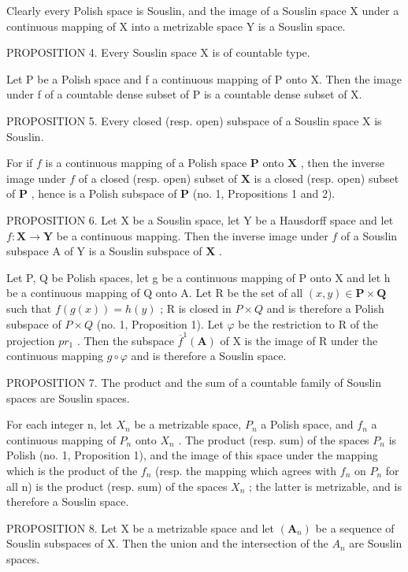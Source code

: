 Clearly every Polish space is Souslin, and the image of a Souslin space X under a continuous mapping of X into a metrizable space Y is a Souslin space.

PROPOSITION 4. Every Souslin space X is of countable type.

Let P be a Polish space and f a continuous mapping of P onto X. Then the image under f of a countable dense subset of P is a countable dense subset of X.

PROPOSITION 5. Every closed (resp. open) subspace of a Souslin space X is Souslin.

For if \(f\) is a continuous mapping of a Polish space \(\mathbf{P}\) onto \(\mathbf{X}\) , then the inverse image under \(f\) of a closed (resp. open) subset of \(\mathbf{X}\) is a closed (resp. open) subset of \(\mathbf{P}\) , hence is a Polish subspace of \(\mathbf{P}\) (no. 1, Propositions 1 and 2).

PROPOSITION 6. Let X be a Souslin space, let Y be a Hausdorff space and let \(f: \mathbf{X} \to \mathbf{Y}\) be a continuous mapping. Then the inverse image under \(f\) of a Souslin subspace A of Y is a Souslin subspace of \(\mathbf{X}\) .

Let P, Q be Polish spaces, let g be a continuous mapping of P onto X and let h be a continuous mapping of Q onto A. Let R be the set of all \((x,y)\in\mathbf{P}\times\mathbf{Q}\) such that \(f(g(x))=h(y)\) ; R is closed in \(P\times Q\) and is therefore a Polish subspace of \(P\times Q\) (no. 1, Proposition 1). Let \(\varphi\) be the restriction to R of the projection \(pr_{1}\) . Then the subspace \(\overline{f}^{1}(\mathbf{A})\) of X is the image of R under the continuous mapping \(g\circ\varphi\) and is therefore a Souslin space.

PROPOSITION 7. The product and the sum of a countable family of Souslin spaces are Souslin spaces.

For each integer n, let \(X_{n}\) be a metrizable space, \(P_{n}\) a Polish space, and \(f_{n}\) a continuous mapping of \(P_{n}\) onto \(X_{n}\) . The product (resp. sum) of the spaces \(P_{n}\) is Polish (no. 1, Proposition 1), and the image of this space under the mapping which is the product of the \(f_{n}\) (resp. the mapping which agrees with \(f_{n}\) on \(P_{n}\) for all n) is the product (resp. sum) of the spaces \(X_{n}\) ; the latter is metrizable, and is therefore a Souslin space.

PROPOSITION 8. Let X be a metrizable space and let \((\mathbf{A}_{n})\) be a sequence of Souslin subspaces of X. Then the union and the intersection of the \(A_{n}\) are Souslin spaces.


